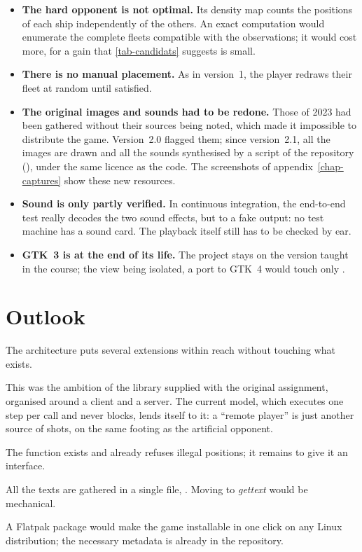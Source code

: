 \begin{itemize}
    \item \textbf{The hard opponent is not optimal.} Its density map counts the positions
          of each ship independently of the others. An exact computation would enumerate the
          complete fleets compatible with the observations; it would cost more, for a gain
          that \cref{tab-candidats} suggests is small.
    \item \textbf{There is no manual placement.} As in version~1, the player redraws their
          fleet at random until satisfied.
    \item \textbf{The original images and sounds had to be redone.} Those of 2023 had been
          gathered without their sources being noted, which made it impossible to distribute
          the game. Version~2.0 flagged them; since version~2.1, all the images are drawn and
          all the sounds synthesised by a script of the repository
          (), under the same licence as the code. The
          screenshots of appendix~\ref{chap-captures} show these new resources.
    \item \textbf{Sound is only partly verified.} In continuous integration, the end-to-end
          test really decodes the two sound effects, but to a fake output: no test machine
          has a sound card. The playback itself still has to be checked by ear.
    \item \textbf{GTK~3 is at the end of its life.} The project stays on the version taught
          in the course; the view being isolated, a port to GTK~4 would touch only
          .
\end{itemize}

\section{Outlook}

The architecture puts several extensions within reach without touching what exists.

\begin{description}[style=nextline, leftmargin=1.2em]
    \item[Two-player game over a network]
          This was the ambition of the library supplied with the original assignment,
          organised around a client and a server. The current model, which executes one step
          per call and never blocks, lends itself to it: a \enquote{remote player} is just
          another source of shots, on the same footing as the artificial opponent.
    \item[Manual placement]
          The function  exists and already refuses illegal
          positions; it remains to give it an interface.
    \item[Translation]
          All the texts are gathered in a single file, . Moving to
          \emph{gettext} would be mechanical.
    \item[Distribution]
          A Flatpak package would make the game installable in one click on any Linux
          distribution; the necessary metadata is already in the repository.
\end{description}
